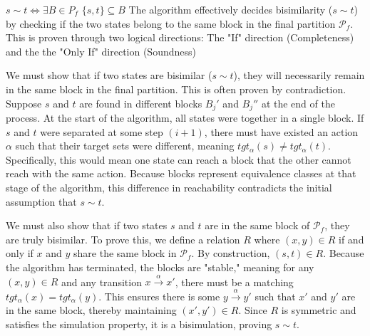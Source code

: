 \begin{Thm}{$s\sim t\iff \exists B\in P_f$ $\{s, t\}\subseteq B$}{}
    The algorithm effectively decides bisimilarity ($s \sim t$) by checking if the two states belong to the same block in the final partition $\mathcal{P}_f$. This is proven through two logical directions:
    The "If" direction (Completeness) and the the "Only If" direction (Soundness)
\begin{demonstration}
    We must show that if two states are bisimilar ($s \sim t$), they will necessarily remain in the same block in the final partition. This is often proven by contradiction. Suppose $s$ and $t$ are found in different blocks $B_j'$ and $B_j''$ at the end of the process. At the start of the algorithm, all states were together in a single block. If $s$ and $t$ were separated at some step $(i+1)$, there must have existed an action $\alpha$ such that their target sets were different, meaning $tgt_{\alpha}(s) \neq tgt_{\alpha}(t)$. Specifically, this would mean one state can reach a block that the other cannot reach with the same action. Because blocks represent equivalence classes at that stage of the algorithm, this difference in reachability contradicts the initial assumption that $s \sim t$.
\end{demonstration}
\begin{demonstration}
    We must also show that if two states $s$ and $t$ are in the same block of $\mathcal{P}_f$, they are truly bisimilar. To prove this, we define a relation $R$ where $(x, y) \in R$ if and only if $x$ and $y$ share the same block in $\mathcal{P}_f$. By construction, $(s, t) \in R$. Because the algorithm has terminated, the blocks are "stable," meaning for any $(x, y) \in R$ and any transition $x \xrightarrow{\alpha} x'$, there must be a matching $tgt_{\alpha}(x) = tgt_{\alpha}(y)$. This ensures there is some $y \xrightarrow{\alpha} y'$ such that $x'$ and $y'$ are in the same block, thereby maintaining $(x', y') \in R$. Since $R$ is symmetric and satisfies the simulation property, it is a bisimulation, proving $s \sim t$.
\end{demonstration}
\end{Thm}

